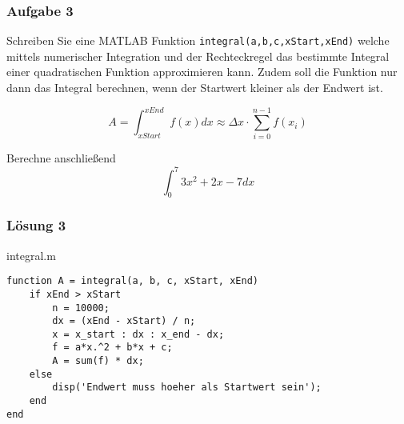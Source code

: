         \subsubsection*{Aufgabe 3}
        Schreiben Sie eine MATLAB Funktion \texttt{integral(a,b,c,xStart,xEnd)} welche mittels numerischer Integration und der Rechteckregel das bestimmte Integral einer quadratischen Funktion approximieren kann. Zudem soll die Funktion nur dann das Integral berechnen, wenn der Startwert kleiner als der Endwert ist.

        \[A=\int_{xStart}^{xEnd}{f(x) dx} \approx \Delta x \cdot \sum_{i=0}^{n-1}f(x_i)\]

        Berechne anschließend
        \[\int_{0}^{7}3x^2 + 2x -7 dx\]
        \subsubsection*{Lösung 3}
        \begin{Codelösung}{integral.m}
                \begin{lstlisting}
function A = integral(a, b, c, xStart, xEnd)
    if xEnd > xStart
        n = 10000;
        dx = (xEnd - xStart) / n;
        x = x_start : dx : x_end - dx;
        f = a*x.^2 + b*x + c;
        A = sum(f) * dx;
    else
        disp('Endwert muss hoeher als Startwert sein');
    end
end
                \end{lstlisting}
        \end{Codelösung}
        